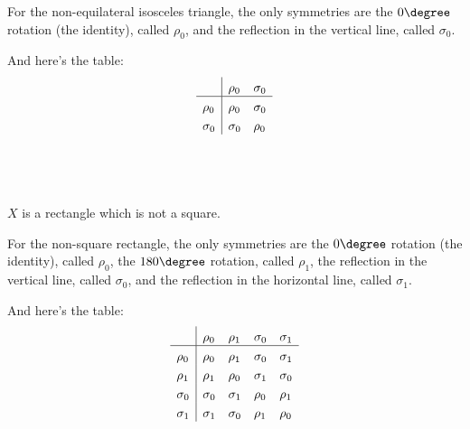 \documentclass[a4paper]{article}
\begin{document}
For the non-equilateral isosceles triangle, the only symmetries are the $0\degree$ rotation (the identity), called $\rho_0$, and the reflection in the vertical line, called $\sigma_0$.

\begin{center}
\end{center}

And here's the table:
\[
\setlength{\extrarowheight}{3pt}%
\begin{array}{l|*{2}{l}}
    & \rho_0 & \sigma_0 \\
\hline
\rho_0 & \rho_0 & \sigma_0 \\
\sigma_0 & \sigma_0 & \rho_0 \\
\end{array} 
\]

\subsection{~} %

\begin{questionbody}
$X$ is a rectangle which is not a square.
\end{questionbody}

For the non-square rectangle, the only symmetries are the $0\degree$ rotation (the identity), called $\rho_0$, the $180\degree$ rotation, called $\rho_1$, the reflection in the vertical line, called $\sigma_0$, and the reflection in the horizontal line, called $\sigma_1$.

\begin{center}
\end{center}

And here's the table:
\[
\setlength{\extrarowheight}{3pt}%
\begin{array}{l|*{4}{l}}
	& \rho_0 & \rho_1 & \sigma_0 & \sigma_1 \\
\hline
\rho_0 & \rho_0 & \rho_1 & \sigma_0 & \sigma_1 \\
\rho_1 & \rho_1 & \rho_0 & \sigma_1 & \sigma_0 \\
\sigma_0 & \sigma_0 & \sigma_1 & \rho_0 & \rho_1 \\
\sigma_1 & \sigma_1 & \sigma_0 & \rho_1 & \rho_0 \\
\end{array} 
\]
\end{document}
